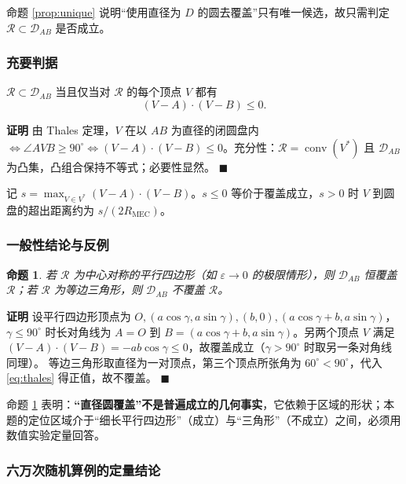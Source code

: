\documentclass{cumcmthesis}
\newtheorem{proposition}{\heiti 命题}
\newenvironment{pf}{\par\noindent\textbf{证明}\quad}{\hfill$\blacksquare$\par}
\begin{document}
命题 \ref{prop:unique} 说明“使用直径为 $D$ 的圆去覆盖”只有唯一候选，故只需判定 $\mathcal R\subset\mathcal D_{AB}$ 是否成立。

\subsubsection{充要判据}

\begin{theorem}[Thales 判据]\label{thm:thales}
$\mathcal R\subset\mathcal D_{AB}$ 当且仅当对 $\mathcal R$ 的每个顶点 $V$ 都有
\begin{equation}
(V-A)\cdot(V-B)\le0 .
\label{eq:thales}
\end{equation}
\end{theorem}
\begin{pf}
由 Thales 定理，$V$ 在以 $AB$ 为直径的闭圆盘内 $\iff\angle AVB\ge90^{\circ}\iff(V-A)\cdot(V-B)\le0$。充分性：$\mathcal R=\operatorname{conv}(V^*)$ 且 $\mathcal D_{AB}$ 为凸集，凸组合保持不等式；必要性显然。
\end{pf}

记 $s=\max_{V\in V^*}(V-A)\cdot(V-B)$。$s\le0$ 等价于覆盖成立，$s>0$ 时 $V$ 到圆盘的超出距离约为 $s/(2R_{\mathrm{MEC}})$。

\subsubsection{一般性结论与反例}

\begin{proposition}\label{prop:para}
若 $\mathcal R$ 为中心对称的平行四边形（如 $\varepsilon\to0$ 的极限情形），则 $\mathcal D_{AB}$ 恒覆盖 $\mathcal R$；若 $\mathcal R$ 为等边三角形，则 $\mathcal D_{AB}$ 不覆盖 $\mathcal R$。
\end{proposition}
\begin{pf}
设平行四边形顶点为 $O,(a\cos\gamma,a\sin\gamma),(b,0),(a\cos\gamma+b,a\sin\gamma)$，$\gamma\le90^{\circ}$ 时长对角线为 $A=O$ 到 $B=(a\cos\gamma+b,a\sin\gamma)$。另两个顶点 $V$ 满足 $(V-A)\cdot(V-B)=-ab\cos\gamma\le0$，故覆盖成立（$\gamma>90^{\circ}$ 时取另一条对角线同理）。
等边三角形取直径为一对顶点，第三个顶点所张角为 $60^{\circ}<90^{\circ}$，代入 \eqref{eq:thales} 得正值，故不覆盖。
\end{pf}

命题 \ref{prop:para} 表明：\textbf{“直径圆覆盖”不是普遍成立的几何事实}，它依赖于区域的形状；本题的定位区域介于“细长平行四边形”（成立）与“三角形”（不成立）之间，必须用数值实验定量回答。

\subsubsection{六万次随机算例的定量结论}
\end{document}
